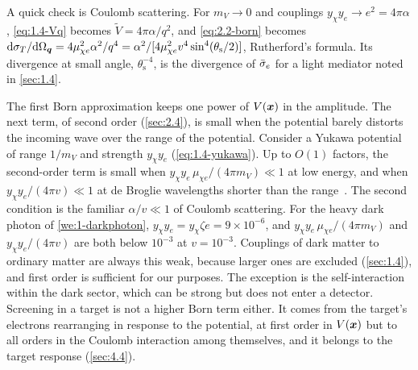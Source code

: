 A quick check is Coulomb scattering. For $m_V \to 0$ and couplings $y_\chi y_e \to e^2 = 4\pi\alpha$, \cref{eq:1.4-Vq} becomes $\tilde V = 4\pi\alpha/q^2$, and \cref{eq:2.2-born} becomes $\mathrm{d}\sigma_T/\mathrm{d}\Omega_{\bm{q}} = 4\mu_{\chi e}^2\alpha^2/q^4 = \alpha^2/[4\mu_{\chi e}^2v^4\sin^4(\theta_{\mathrm{s}}/2)]$, Rutherford's formula. Its divergence at small angle, $\theta_{\mathrm{s}}^{-4}$, is the divergence of $\bar{\sigma}_{e}$ for a light mediator noted in \cref{sec:1.4}.

The first Born approximation keeps one power of $V(\bm{x})$ in the amplitude. The next term, of second order (\cref{sec:2.4}), is small when the potential barely distorts the incoming wave over the range of the potential. Consider a Yukawa potential of range $1/m_V$ and strength $y_\chi y_e$ (\cref{eq:1.4-yukawa}). Up to $O(1)$ factors, the second-order term is small when $y_\chi y_e\,\mu_{\chi e}/(4\pi m_V) \ll 1$ at low energy, and when $y_\chi y_e/(4\pi v) \ll 1$ at de Broglie wavelengths shorter than the range~\cite[Chap.~6]{sakurai2017modern}. The second condition is the familiar $\alpha/v \ll 1$ of Coulomb scattering. For the heavy dark photon of \cref{we:1-darkphoton}, $y_\chi y_e = y_\chi\zeta e = 9\times10^{-6}$, and $y_\chi y_e\,\mu_{\chi e}/(4\pi m_V)$ and $y_\chi y_e/(4\pi v)$ are both below $10^{-3}$ at $v = 10^{-3}$. Couplings of dark matter to ordinary matter are always this weak, because larger ones are excluded (\cref{sec:1.4}), and first order is sufficient for our purposes. The exception is the self-interaction within the dark sector, which can be strong but does not enter a detector. Screening in a target is not a higher Born term either. It comes from the target's electrons rearranging in response to the potential, at first order in $V(\bm{x})$ but to all orders in the Coulomb interaction among themselves, and it belongs to the target response (\cref{sec:4.4}).

